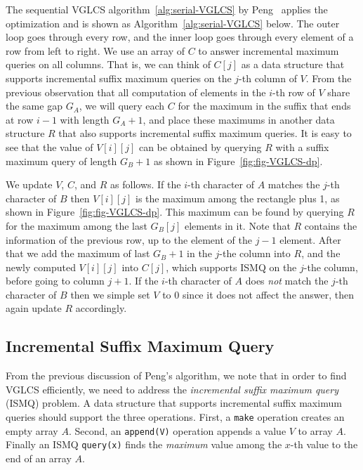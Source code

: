 The sequential VGLCS algorithm~\ref{alg:serial-VGLCS} by
Peng~\cite{Peng2011TheLC} applies the optimization and is shown as
Algorithm~\ref{alg:serial-VGLCS} below.  The outer loop goes through
every row, and the inner loop goes through every element of a row from
left to right.  We use an array of $C$ to answer incremental maximum
queries on all columns.  That is, we can think of $C[j]$ as a data
structure that supports incremental suffix maximum queries on the
$j$-th column of $V$.  From the previous observation that all
computation of elements in the $i$-th row of $V$ share the same gap
$G_A$, we will query each $C$ for the maximum in the suffix that ends
at row $i-1$ with length $G_A + 1$, and place these maximums in
another data structure $R$ that also supports incremental suffix
maximum queries.  It is easy to see that the value of $V[i][j]$ can be
obtained by querying $R$ with a suffix maximum query of length $G_B +
1$ as shown in Figure~\ref{fig:fig-VGLCS-dp}.

We update $V$, $C$, and $R$ as follows.  If the $i$-th character of
$A$ matches the $j$-th character of $B$ then $V[i][j]$ is the maximum
among the rectangle plus 1, as shown in Figure~\ref{fig:fig-VGLCS-dp}.
This maximum can be found by querying $R$ for the maximum among the
last $G_B[j]$ elements in it.  Note that $R$ contains the information
of the previous row, up to the element of the $j-1$ element.  After
that we add the maximum of last $G_B + 1$ in the $j$-the column into
$R$, and the newly computed $V[i][j]$ into $C[j]$, which supports
ISMQ on the $j$-the column, before going to column $j + 1$.  If the
$i$-th character of $A$ does {\em not} match the $j$-th character of
$B$ then we simple set $V$ to 0 since it does not affect the answer,
then again update $R$ accordingly.
 



\subsection{Incremental Suffix Maximum Query}

From the previous discussion of Peng's algorithm, we note that in
order to find VGLCS efficiently, we need to address the {\em
  incremental suffix maximum query} (ISMQ) problem.  A data structure
that supports incremental suffix maximum queries should support the
three operations.  First, a {\tt make} operation creates an empty
array $A$. Second, an {\tt append(V)} operation appends a value $V$ to
array $A$. Finally an ISMQ {\tt query(x)} finds the {\em maximum}
value among the $x$-th value to the end of an array $A$.

